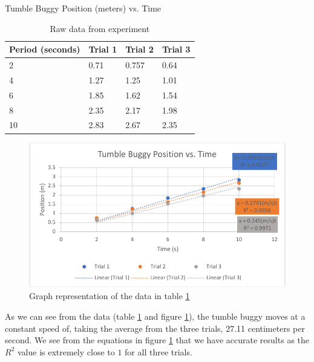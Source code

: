 \documentclass[12pt]{article}
\begin{document}
\begin{table}
    \centering
    Tumble Buggy Position (meters) vs. Time\\
    \begin{tabular}{|l|l|l|l|}
    \hline
        Period (seconds) & Trial 1 & Trial 2 & Trial 3 \\ \hline
        2 & 0.71 & 0.757 & 0.64 \\ \hline
        4 & 1.27 & 1.25 & 1.01 \\ \hline
        6 & 1.85 & 1.62 & 1.54 \\ \hline
        8 & 2.35 & 2.17 & 1.98 \\ \hline
        10 & 2.83 & 2.67 & 2.35 \\ \hline
    \end{tabular}
    \caption{Raw data from experiment}
    \label{table:data}
\end{table}

\begin{figure}
    \centering
    \includegraphics{tumble_buggy_position_vs_time_graph.pdf}
    \caption{Graph representation of the data in table \ref{table:data}}
    \label{figure:data}
\end{figure}

As we can see from the data (table \ref{table:data} and figure
\ref{figure:data}), the tumble buggy moves at a constant speed of, taking the
average from the three trials,
27.11 centimeters per second. We see from the equations in figure
\ref{figure:data} that we have accurate results as the $R^2$ value is extremely
close to $1$ for all three trials.
\end{document}
